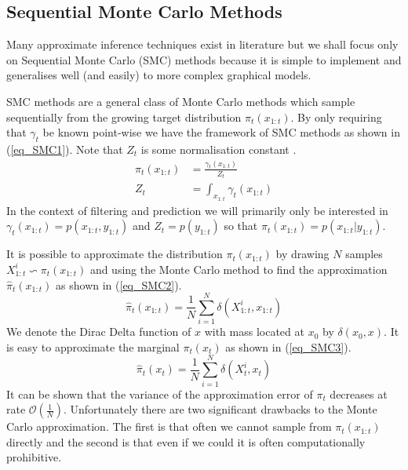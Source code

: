 \documentclass[../masters.tex]{subfiles}
\begin{document}
\subsection{Sequential Monte Carlo Methods}
Many approximate inference techniques exist in literature but we shall focus only on Sequential Monte Carlo (SMC) methods because it is simple to implement and generalises well (and easily) to more complex graphical models. 

SMC methods are a general class of Monte Carlo methods which sample sequentially from the growing target distribution $\pi_t(x_{1:t})$. By only requiring that $\gamma_t$ be known point-wise we have the framework of SMC methods as shown in (\ref{eq_SMC1}). Note that $Z_t$ is some normalisation constant \cite{pftut}.
\begin{equation}
\begin{aligned}
\pi_t(x_{1:t}) &= \frac{\gamma_t(x_{1:t})}{Z_t} \\
Z_t &= \int_{x_{1:t}} \gamma_t(x_{1:t})
\end{aligned}
\label{eq_SMC1}
\end{equation} 
In the context of filtering and prediction we will primarily only be interested in $\gamma_t(x_{1:t}) = p(x_{1:t},y_{1:t})$ and $Z_t = p(y_{1:t})$ so that $\pi_t(x_{1:t}) = p(x_{1:t}|y_{1:t})$. 

It is possible to approximate the distribution $\pi_t(x_{1:t})$ by drawing $N$ samples $X_{1:t}^i \backsim \pi_t(x_{1:t})$ and using the Monte Carlo method to find the approximation $\hat{\pi}_t(x_{1:t})$ as shown in (\ref{eq_SMC2}).
\begin{equation}
\hat{\pi}_t(x_{1:t}) = \frac{1}{N}\sum_{i=1}^N \delta(X^i_{1:t}, x_{1:t})
\label{eq_SMC2}
\end{equation}
We denote the Dirac Delta function of $x$ with mass located at $x_0$ by $\delta(x_0,x)$. It is easy to approximate the marginal $\pi_t(x_{t})$ as shown in (\ref{eq_SMC3}).
\begin{equation}
\hat{\pi}_t(x_{t}) = \frac{1}{N}\sum_{i=1}^N \delta(X^i_{t}, x_{t})
\label{eq_SMC3}
\end{equation}
It can be shown that the variance of the approximation error of $\pi_t$ decreases at rate $\mathcal{O}(\frac{1}{N})$. Unfortunately there are two significant drawbacks to the Monte Carlo approximation. The first is that often we cannot sample from $\pi_t(x_{1:t})$ directly and the second is that even if we could it is often computationally prohibitive. 
\end{document}
